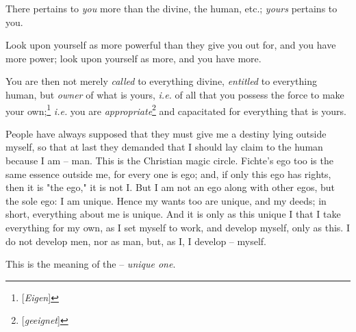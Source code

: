 There pertains to \textit{you} more than the divine, the human, etc.; 
\textit{yours} pertains to you.

Look upon yourself as more powerful than they give you out for, and you have 
more power; look upon yourself as more, and you have more.

You are then not merely \textit{called} to everything divine, 
\textit{entitled} to everything human, but \textit{owner} of what is yours, 
\textit{i.e.} of all that you possess the force to make your 
own;\footnote{[\textit{Eigen}]} \textit{i.e.} you are 
\textit{appropriate}\footnote{[\textit{geeignet}]} and capacitated for 
everything that is yours.

People have always supposed that they must give me a destiny lying outside 
myself, so that at last they demanded that I should lay claim to the human 
because I am -- man. This is the Christian magic circle. Fichte's ego too is 
the same essence outside me, for every one is ego; and, if only this ego has 
rights, then it is "{}the ego,"{} it is not I. But I am not an ego along with 
other egos, but the sole ego: I am unique. Hence my wants too are unique, and 
my deeds; in short, everything about me is unique. And it is only as this 
unique I that I take everything for my own, as I set myself to work, and 
develop myself, only as this. I do not develop men, nor as man, but, as I, I 
develop -- myself.

This is the meaning of the -- \textit{unique one}.
